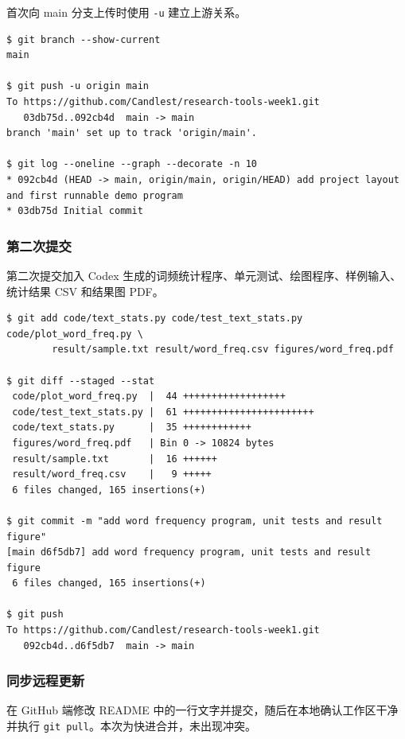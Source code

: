 \documentclass{SYSUReport}
\begin{document}
首次向 main 分支上传时使用 \verb|-u| 建立上游关系。

\begin{lstlisting}[style=shell, caption={建立上游关系并上传}]
$ git branch --show-current
main

$ git push -u origin main
To https://github.com/Candlest/research-tools-week1.git
   03db75d..092cb4d  main -> main
branch 'main' set up to track 'origin/main'.

$ git log --oneline --graph --decorate -n 10
* 092cb4d (HEAD -> main, origin/main, origin/HEAD) add project layout and first runnable demo program
* 03db75d Initial commit
\end{lstlisting}

\subsubsection{第二次提交}

第二次提交加入 Codex 生成的词频统计程序、单元测试、绘图程序、样例输入、统计结果 CSV 和结果图 PDF。

\begin{lstlisting}[style=shell, caption={第二次提交并上传}]
$ git add code/text_stats.py code/test_text_stats.py code/plot_word_freq.py \
        result/sample.txt result/word_freq.csv figures/word_freq.pdf

$ git diff --staged --stat
 code/plot_word_freq.py  |  44 ++++++++++++++++++
 code/test_text_stats.py |  61 +++++++++++++++++++++++
 code/text_stats.py      |  35 ++++++++++++
 figures/word_freq.pdf   | Bin 0 -> 10824 bytes
 result/sample.txt       |  16 ++++++
 result/word_freq.csv    |   9 +++++
 6 files changed, 165 insertions(+)

$ git commit -m "add word frequency program, unit tests and result figure"
[main d6f5db7] add word frequency program, unit tests and result figure
 6 files changed, 165 insertions(+)

$ git push
To https://github.com/Candlest/research-tools-week1.git
   092cb4d..d6f5db7  main -> main
\end{lstlisting}

\subsubsection{同步远程更新}

在 GitHub 端修改 README 中的一行文字并提交，随后在本地确认工作区干净并执行 \verb|git pull|。本次为快进合并，未出现冲突。
\end{document}
